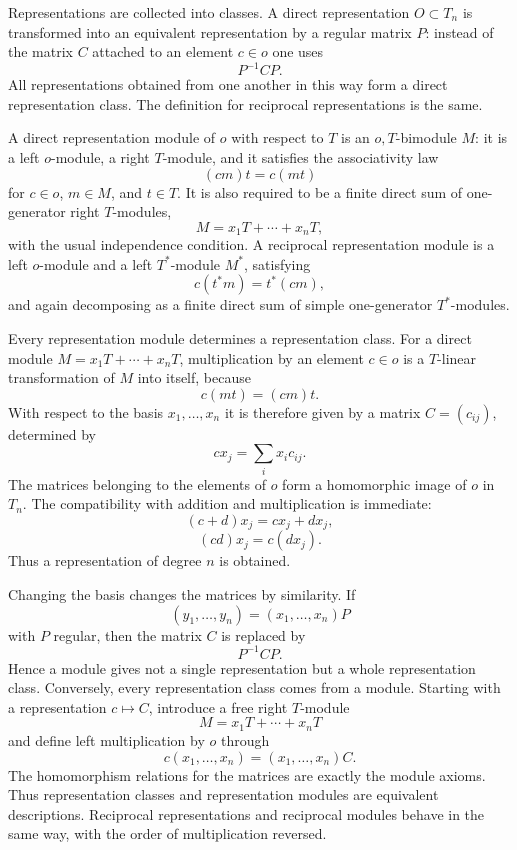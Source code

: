 \documentclass[12pt]{article}
\begin{document}
Representations are collected into classes. A direct representation \(O\subset T_n\) is transformed into an equivalent representation by a regular matrix \(P\): instead of the matrix \(C\) attached to an element \(c\in o\) one uses
\[
  P^{-1}CP.
\]
All representations obtained from one another in this way form a direct representation class. The definition for reciprocal representations is the same.

A direct representation module of \(o\) with respect to \(T\) is an \(o,T\)-bimodule \(M\): it is a left \(o\)-module, a right \(T\)-module, and it satisfies the associativity law
\[
  (cm)t=c(mt)
\]
for \(c\in o\), \(m\in M\), and \(t\in T\). It is also required to be a finite direct sum of one-generator right \(T\)-modules,
\[
  M=x_1T+\cdots+x_nT,
\]
with the usual independence condition. A reciprocal representation module is a left \(o\)-module and a left \(T^*\)-module \(M^*\), satisfying
\[
  c(t^*m)=t^*(cm),
\]
and again decomposing as a finite direct sum of simple one-generator \(T^*\)-modules.

Every representation module determines a representation class. For a direct module \(M=x_1T+
\cdots+x_nT\), multiplication by an element \(c\in o\) is a \(T\)-linear transformation of \(M\) into itself, because
\[
  c(mt)=(cm)t.
\]
With respect to the basis \(x_1,
\ldots,x_n\) it is therefore given by a matrix \(C=(c_{ij})\), determined by
\[
  c x_j=\sum_i x_i c_{ij}.
\]
The matrices belonging to the elements of \(o\) form a homomorphic image of \(o\) in \(T_n\). The compatibility with addition and multiplication is immediate:
\[
  (c+d)x_j=cx_j+dx_j,
\]
\[
  (cd)x_j=c(dx_j).
\]
Thus a representation of degree \(n\) is obtained.

Changing the basis changes the matrices by similarity. If
\[
  (y_1,
\ldots,y_n)=(x_1,
\ldots,x_n)P
\]
with \(P\) regular, then the matrix \(C\) is replaced by
\[
  P^{-1}CP.
\]
Hence a module gives not a single representation but a whole representation class. Conversely, every representation class comes from a module. Starting with a representation \(c\mapsto C\), introduce a free right \(T\)-module
\[
  M=x_1T+
\cdots+x_nT
\]
and define left multiplication by \(o\) through
\[
  c(x_1,
\ldots,x_n)=(x_1,
\ldots,x_n)C.
\]
The homomorphism relations for the matrices are exactly the module axioms. Thus representation classes and representation modules are equivalent descriptions. Reciprocal representations and reciprocal modules behave in the same way, with the order of multiplication reversed.
\end{document}

